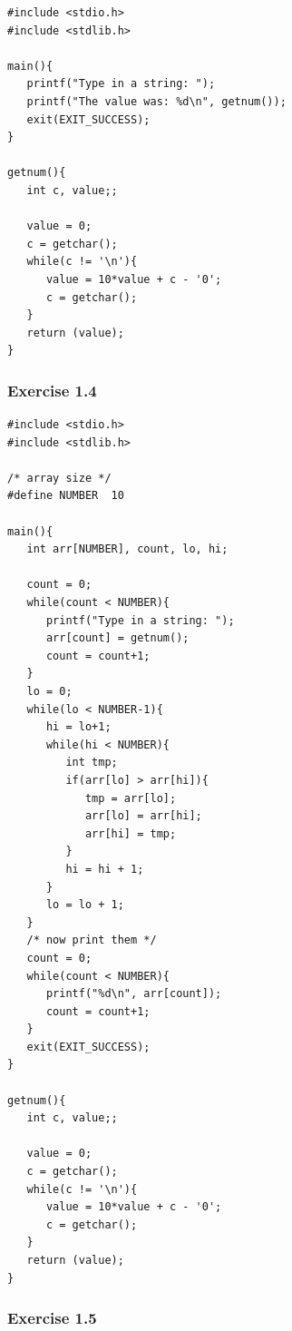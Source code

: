    \begin{Verbatim}
#include <stdio.h>
#include <stdlib.h>

main(){
   printf("Type in a string: ");
   printf("The value was: %d\n", getnum());
   exit(EXIT_SUCCESS);
}

getnum(){
   int c, value;;

   value = 0;
   c = getchar();
   while(c != '\n'){
      value = 10*value + c - '0';
      c = getchar();
   }
   return (value);
}
\end{Verbatim}

  

  \subsubsection*{Exercise 1.4}

   \begin{Verbatim}
#include <stdio.h>
#include <stdlib.h>

/* array size */
#define NUMBER  10

main(){
   int arr[NUMBER], count, lo, hi;

   count = 0;
   while(count < NUMBER){
      printf("Type in a string: ");
      arr[count] = getnum();
      count = count+1;
   }
   lo = 0;
   while(lo < NUMBER-1){
      hi = lo+1;
      while(hi < NUMBER){
         int tmp;
         if(arr[lo] > arr[hi]){
            tmp = arr[lo];
            arr[lo] = arr[hi];
            arr[hi] = tmp;
         }
         hi = hi + 1;
      }
      lo = lo + 1;
   }
   /* now print them */
   count = 0;
   while(count < NUMBER){
      printf("%d\n", arr[count]);
      count = count+1;
   }
   exit(EXIT_SUCCESS);
}

getnum(){
   int c, value;;

   value = 0;
   c = getchar();
   while(c != '\n'){
      value = 10*value + c - '0';
      c = getchar();
   }
   return (value);
}
\end{Verbatim}

  

  \subsubsection*{Exercise 1.5}

